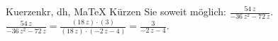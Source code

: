 \begin{MAufgabe}{Kuerzen}{kr, dh, MaTeX}
K\"urzen Sie soweit m\"oglich: $\frac{54\, z}{ - 36\, z^2 - 72\, z}$.\\ 
\ifLsg\MLoesung
\quad $\frac{54\, z}{ - 36\, z^2 - 72\, z}=\frac{(18\, z)\cdot(3)}{(18\, z)\cdot( - 2\, z - 4)}=\frac{3}{ - 2\, z - 4}$.\else\relax\fi
 \end{MAufgabe}
